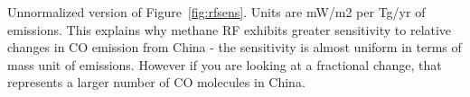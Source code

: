 Unnormalized version of Figure~\ref{fig:rfsens}. Units are mW/m2 per Tg/yr of emissions. This explains why methane RF exhibits greater sensitivity to relative changes in CO emission from China - the sensitivity is almost uniform in terms of mass unit of emissions. However if you are looking at a fractional change, that represents a larger number of CO molecules in China.